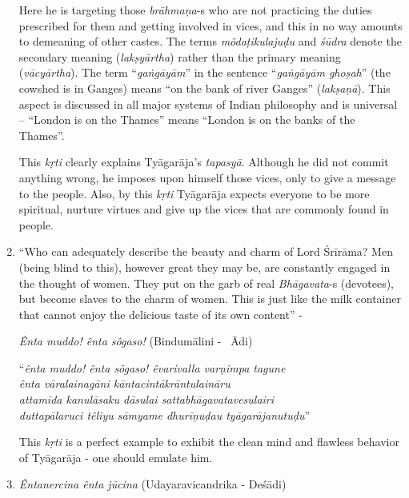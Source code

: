 \begin{enumerate}
 Here he is targeting those \textit{brāhmaṇa}-s who are not practicing the duties prescribed for them and getting involved in vices, and this in no way amounts to demeaning of other castes. The terms \textit{môdaṭikulajuḍu} and \textit{śūdra} denote the secondary meaning (\textit{lakṣyārtha}) rather than the primary meaning (\textit{vācyārtha}). The term “\textit{gaṅgāyām}” in the sentence “\textit{gaṅgāyām ghoṣah}” (the cowshed is in Ganges) means “on the bank of river Ganges” (\textit{lakṣaṇā}). This aspect is discussed in all major systems of Indian philosophy and is universal – “London is on the Thames” means “London is on the banks of the Thames”.

 This \textit{kṛti} clearly explains Tyāgarāja’s \textit{tapasyā}. Although he did not commit anything wrong, he imposes upon himself those vices, only to give a message to the people. Also, by this \textit{kṛti} Tyāgarāja expects everyone to be more spiritual, nurture virtues and give up the vices that are commonly found in people.

 \item 
 “Who can adequately describe the beauty and charm of Lord Śrīrāma? Men (being blind to this), however great they may be, are constantly engaged in the thought of women. They put on the garb of real \textit{Bhāgavata}-s (devotees), but become slaves to the charm of women. This is just like the milk container that cannot enjoy the delicious taste of its own content” -

 \textit{Ênta muddo! ênta sôgaso!} (Bindumālini -  Ādi)

\begin{longquote}
“\textit{ênta muddo! ênta sôgaso! êvarivalla varṇimpa tagune}\\ \textit{ênta vāralainagāni kāntacintākrāntulaināru}\\ \textit{attamīda kanulāsaku dāsulai sattabhāgavatavesulairi}\\\textit{duttapālaruci têliyu sāmyame dhurīṇuḍau tyāgarājanutuḍu}”
\end{longquote}

 This \textit{kṛti} is a perfect example to exhibit the clean mind and flawless behavior of Tyāgarāja - one should emulate him.

 \item 
 \textit{Êntanercina ênta jūcina} (Udayaravicandrika - Deśādi)


\end{enumerate}

